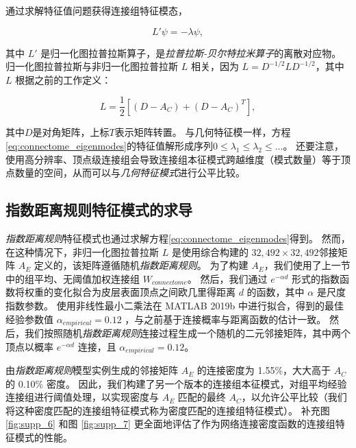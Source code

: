 \documentclass[lang=cn,a4paper,newtx]{elegantpaper}
\begin{document}
通过求解特征值问题获得连接组特征模态，


\begin{equation}\label{eq:connectome_eigenmodes}
	L' \psi = - \lambda \psi,
\end{equation}

其中 $ L' $ 是归一化图拉普拉斯算子，是\textit{拉普拉斯-贝尔特拉米算子}的离散对应物。
归一化图拉普拉斯与非归一化图拉普拉斯 $ L $ 相关，因为 $ L = D^{−1/2}LD^{−1/2} $，其中 $ L $ 根据之前的工作\cite{levy2006laplace}定义：

\begin{equation}\label{eq:unnormalized_Laplacian}
	L = \frac{1}{2} [ (D-A_C) + (D-A_C)^T ],
\end{equation}

其中$ D $是对角矩阵，上标$ T $表示矩阵转置。
与几何特征模一样，方程\ref{eq:connectome_eigenmodes}的特征值解形成序列$ 0 \leq \lambda_1 \leq \lambda_2 \leq ... $。
还要注意，使用高分辨率、顶点级连接组会导致连接组本征模式跨越维度（模式数量）等于顶点数量的空间，从而可以与\textit{几何特征模式}进行公平比较。



\subsection{指数距离规则特征模式的求导} \label{sec:EDR_derivation}

\textit{指数距离规则}特征模式也通过求解方程\ref{eq:connectome_eigenmodes}得到。
然而，在这种情况下，非归一化图拉普拉斯 $ L $ 是使用综合构建的 $ 32,492 \times 32,492  $邻接矩阵 $ A_E $ 定义的，该矩阵遵循随机\textit{指数距离规则}。
为了构建 $ A_E $，我们使用了上一节中的组平均、无阈值加权连接组 $ W_{connectome} $。
然后，我们通过 $ e^{-\alpha d} $ 形式的指数函数将权重的变化拟合为皮层表面顶点之间欧几里得距离 $ d $ 的函数，其中 $ \alpha $ 是尺度指数参数。
使用非线性最小二乘法在 MATLAB 2019b 中进行拟合，得到的最佳经验参数值 $ \alpha_{empirical} = 0.12 $ ，与之前基于连接概率与距离函数的估计一致\cite{theodoni2022structural}。
然后，我们按照随机\textit{指数距离规则}连接过程生成一个随机的二元邻接矩阵，其中两个顶点以概率 $ e^{-\alpha d} $ 连接，且 $ \alpha_{empirical} = 0.12 $。


由\textit{指数距离规则}模型实例生成的邻接矩阵 $ A_E $ 的连接密度为 1.55\%，大大高于 $ A_C $ 的 0.10\% 密度。
因此，我们构建了另一个版本的连接组本征模式，对组平均经验连接组进行阈值处理，以实现密度与 $ A_E $ 匹配的最终 $ A_C $，以允许公平比较（我们将这种密度匹配的连接组特征模式称为密度匹配的连接组特征模式）。
补充图\ref{fig:supp_6} 和图 \ref{fig:supp_7} 更全面地评估了作为网络连接密度函数的连接组特征模式的性能。
\end{document}
